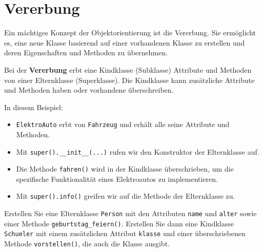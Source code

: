 \section{Vererbung}

Ein mächtiges Konzept der Objektorientierung ist die Vererbung. Sie ermöglicht es, eine neue Klasse basierend auf einer vorhandenen Klasse zu erstellen und deren Eigenschaften und Methoden zu übernehmen.

\begin{mydefinition}
Bei der \textbf{Vererbung} erbt eine Kindklasse (Subklasse) Attribute und Methoden von einer Elternklasse (Superklasse). Die Kindklasse kann zusätzliche Attribute und Methoden haben oder vorhandene überschreiben.
\end{mydefinition}

\begin{myexample}[Vererbung]

\end{myexample}

In diesem Beispiel:
\begin{itemize}
    \item \lstinline|ElektroAuto| erbt von \lstinline|Fahrzeug| und erhält alle seine Attribute und Methoden.
    \item Mit \lstinline|super().__init__(...)| rufen wir den Konstruktor der Elternklasse auf.
    \item Die Methode \lstinline|fahren()| wird in der Kindklasse überschrieben, um die spezifische Funktionalität eines Elektroautos zu implementieren.
    \item Mit \lstinline|super().info()| greifen wir auf die Methode der Elternklasse zu.
\end{itemize}

\begin{myexercise}
    Erstellen Sie eine Elternklasse \lstinline|Person| mit den Attributen \lstinline|name| und \lstinline|alter| sowie einer Methode \lstinline|geburtstag_feiern()|. Erstellen Sie dann eine Kindklasse \lstinline|Schueler| mit einem zusätzlichen Attribut \lstinline|klasse| und einer überschriebenen Methode \lstinline|vorstellen()|, die auch die Klasse ausgibt.

    \begin{myanswer}
        
    \end{myanswer}
\end{myexercise}


